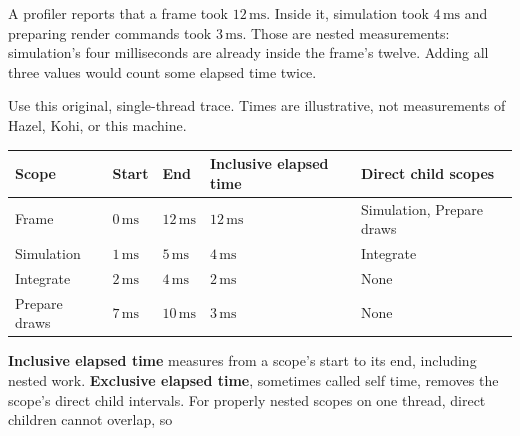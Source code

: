 A profiler reports that a frame took \(12\,\mathrm{ms}\). Inside it, simulation took \(4\,\mathrm{ms}\) and preparing render commands took \(3\,\mathrm{ms}\). Those are nested measurements: simulation's four milliseconds are already inside the frame's twelve. Adding all three values would count some elapsed time twice.

Use this original, single-thread trace. Times are illustrative, not measurements of Hazel, Kohi, or this machine.

{\def\LTcaptype{none} %
\begin{longtable}[]{@{}
  >{\raggedright\arraybackslash}p{}
  >{\raggedleft\arraybackslash}p{}
  >{\raggedleft\arraybackslash}p{}
  >{\raggedleft\arraybackslash}p{}
  >{\raggedright\arraybackslash}p{}@{}}
\toprule\noalign{}
\begin{minipage}[b]{\linewidth}\raggedright
Scope
\end{minipage} & \begin{minipage}[b]{\linewidth}\raggedleft
Start
\end{minipage} & \begin{minipage}[b]{\linewidth}\raggedleft
End
\end{minipage} & \begin{minipage}[b]{\linewidth}\raggedleft
Inclusive elapsed time
\end{minipage} & \begin{minipage}[b]{\linewidth}\raggedright
Direct child scopes
\end{minipage} \\
\midrule\noalign{}
\endhead
\bottomrule\noalign{}
\endlastfoot
Frame & \(0\,\mathrm{ms}\) & \(12\,\mathrm{ms}\) & \(12\,\mathrm{ms}\) & Simulation, Prepare draws \\
Simulation & \(1\,\mathrm{ms}\) & \(5\,\mathrm{ms}\) & \(4\,\mathrm{ms}\) & Integrate \\
Integrate & \(2\,\mathrm{ms}\) & \(4\,\mathrm{ms}\) & \(2\,\mathrm{ms}\) & None \\
Prepare draws & \(7\,\mathrm{ms}\) & \(10\,\mathrm{ms}\) & \(3\,\mathrm{ms}\) & None \\
\end{longtable}
}

\textbf{Inclusive elapsed time} measures from a scope's start to its end, including nested work. \textbf{Exclusive elapsed time}, sometimes called self time, removes the scope's direct child intervals. For properly nested scopes on one thread, direct children cannot overlap, so


